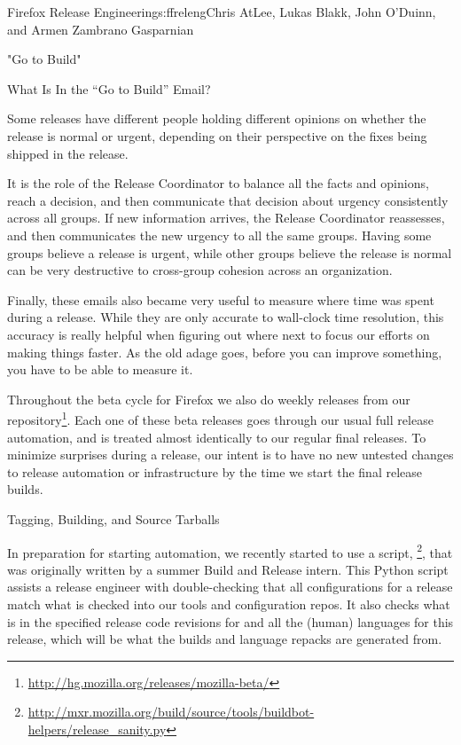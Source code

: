 \begin{aosachapter}{Firefox Release Engineering}{s:ffreleng}{Chris AtLee, Lukas Blakk, John O'Duinn, and Armen Zambrano Gasparnian}
\begin{aosasect1}{"Go to Build"}
\begin{aosasect2}{What Is In the ``Go to Build'' Email?}
\begin{aosaenumerate}
\begin{aosaenumerate2}
    \item Some releases have different people holding different
      opinions on whether the release is normal or urgent,
      depending on their perspective on the fixes being shipped in the
      release.

  \end{aosaenumerate2}

\end{aosaenumerate}

It is the role of the Release Coordinator to balance all the facts and
opinions, reach a decision, and then communicate that decision about
urgency consistently across all groups. If new information arrives,
the Release Coordinator reassesses, and then communicates the new
urgency to all the same groups. Having some groups believe a release
is urgent, while other groups believe the release is normal
can be very destructive to cross-group cohesion across an
organization.

Finally, these emails also became very useful to measure where time
was spent during a release.  While they are only accurate to
wall-clock time resolution, this accuracy is really helpful when
figuring out where next to focus our efforts on making things faster.
As the old adage goes, before you can improve something, you
have to be able to measure it.

Throughout the beta cycle for Firefox we also do weekly releases from
our 
repository\footnote{\url{http://hg.mozilla.org/releases/mozilla-beta/}}. Each
one of these beta releases goes through our usual full release
automation, and is treated almost identically to our regular final
releases. To minimize surprises during a release, our intent is to
have no new untested changes to release automation or
infrastructure by the time we start the final release builds.

\end{aosasect2}

\end{aosasect1}

\begin{aosasect1}{Tagging, Building, and Source Tarballs}

    
In preparation for starting automation, we recently started to use a
script,
\footnote{\url{http://mxr.mozilla.org/build/source/tools/buildbot-helpers/release_sanity.py}},
that was originally written by a summer Build and Release intern. This
Python script assists a release engineer with double-checking that all
configurations for a release match what is checked into our tools and
configuration repos.  It also checks what is in the specified release
code revisions for  and all the (human)
languages for this release, which will be what the builds and language
repacks are generated from.


\end{aosasect1}
\end{aosachapter}
